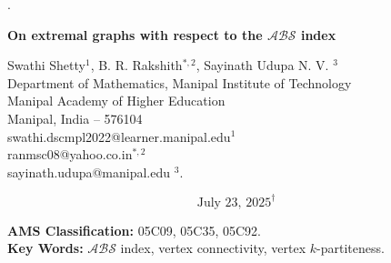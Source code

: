 \documentclass[12pt]{article}
\begin{document}
.
	\baselineskip 16pt
	\newcommand{\la}{\lambda}
	\newcommand{\si}{\sigma}
	\newcommand{\ol}{1-\lambda}
	\newcommand{\be}{\begin{equation}}
		\newcommand{\ee}{\end{equation}}
	\newcommand{\bea}{\begin{eqnarray}}
		\newcommand{\eea}{\end{eqnarray}}
	
	
	\baselineskip=0.30in
		\baselineskip=0.30in
         \textbf{\Large{On extremal graphs with respect to the $\mathcal{ABS}$ index}}
	\vspace*{0.3cm} 
\begin{center}
Swathi Shetty$^{1}$, B. R. Rakshith$^{*,2}$, Sayinath Udupa N. V. $^{3}$\\
Department of Mathematics, Manipal Institute of Technology\\ Manipal Academy of Higher Education\\ Manipal, India -- 576104\\
swathi.dscmpl2022@learner.manipal.edu$^{1}$\\
ranmsc08@yahoo.co.in$^{*,2}$\\
sayinath.udupa@manipal.edu	$^{3}$.
\end{center}
\[\text{July 23, 2025}^\dagger\]
\begin{abstract}       Recently, Ali et al. \cite{ali2024extremal} posed several open problems concerning extremal graphs with respect to the $\mathcal{ABS}$ index. These problems involve characterizing graphs that attain the maximum $\mathcal{ABS}$ index within specific graph classes, including: (i) connected graphs with \( n \) vertices and \( p \) cut-vertices; (ii) connected graphs of order \( n \) with vertex $k$-partiteness \( v_k(G) = r \); and (iii) connected bipartite graphs of order \( n \) with a fixed vertex connectivity \( \kappa \). In this paper, we provide complete solutions to all of these problems.   \end{abstract}
        \noindent
        {\bf AMS Classification:}  05C09, 05C35, 05C92.
        \\
        \noindent
        {\bf Key Words:} $\mathcal{ABS}$ index, vertex connectivity, vertex $k$-partiteness.
\end{document}
